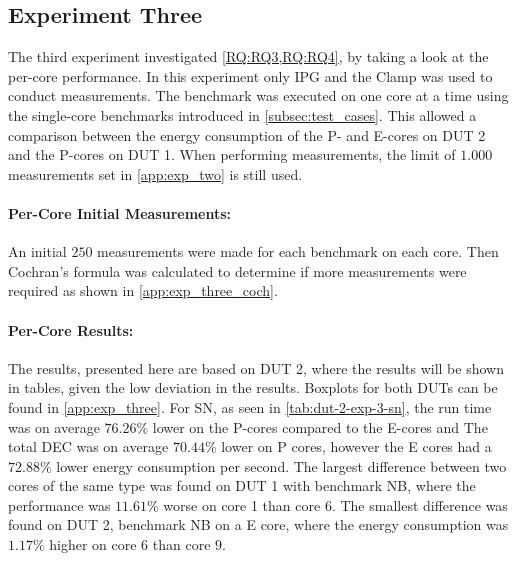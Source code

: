\subsection{Experiment Three}\label{subsec:exp_three}

The third experiment investigated \cref{RQ:RQ3,RQ:RQ4}, by taking a look at the per-core performance. In this experiment only IPG and the Clamp was used to conduct measurements. The benchmark was executed on one core at a time using the single-core benchmarks introduced in \cref{subsec:test_cases}. This allowed a comparison between the energy consumption of the P- and E-cores on DUT 2 and the P-cores on DUT 1. When performing measurements, the limit of $1.000$ measurements set in \cref{app:exp_two} is still used.


\paragraph{Per-Core Initial Measurements:} An initial $250$ measurements were made for each benchmark on each core. Then Cochran's formula was calculated to determine if more measurements were required as shown in \cref{app:exp_three_coch}.




\paragraph{Per-Core Results:} The results, presented here are based on DUT 2, where the results will be shown in tables, given the low deviation in the results. Boxplots for both DUTs can be found in \cref{app:exp_three}. For SN, as seen in \cref{tab:dut-2-exp-3-sn}, the run time was on average $76.26\%$ lower on the P-cores compared to the E-cores and The total DEC was on average $70.44\%$ lower on P cores, however the E cores had a $72.88\%$ lower energy consumption per second. %
The largest difference between two cores of the same type was found on DUT 1 with benchmark NB, where the performance was $11.61\%$ worse on core 1 than core 6. The smallest difference was found on DUT 2, benchmark NB on a E core, where the energy consumption was $1.17\%$ higher on core $6$ than core $9$.

